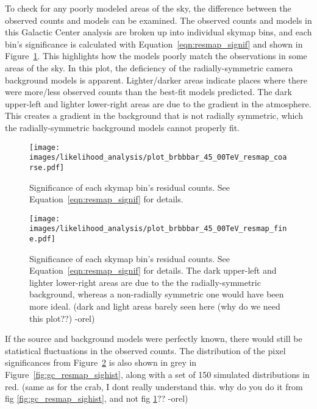  To check for any poorly modeled areas of the sky, the difference between the observed counts and models can be examined.
  The observed counts and models in this Galactic Center analysis are broken up into individual skymap bins, and each bin's significance is calculated with Equation~\ref{eqn:resmap_signif} and shown in Figure~\ref{fig:gc_resmap}.
  This highlights how the models poorly match the observations in some areas of the sky.
  In this plot, the deficiency of the radially-symmetric camera background models is apparent.
  Lighter/darker areas indicate places where there were more/less observed counts than the best-fit models predicted.
  The dark upper-left and lighter lower-right areas are due to the gradient in the atmosphere.
  This creates a gradient in the background that is not radially symmetric, which the radially-symmetric background models cannot properly fit.
  
  \begin{figure}[ht]
    \centering
    \texttt{[image: images/likelihood\_analysis/plot\_brbbbar\_45\_00TeV\_resmap\_coarse.pdf]}
    \caption[Galactic Center Residual Map Coarse Binning]
    {
      Significance of each skymap bin's residual counts.
      See Equation~\ref{eqn:resmap_signif} for details.
    }
    \label{fig:gc_resmap}
  \end{figure}
  
  \begin{figure}[ht]
    \centering
    \texttt{[image: images/likelihood\_analysis/plot\_brbbbar\_45\_00TeV\_resmap\_fine.pdf]}
    \caption[Galactic Center Residual Map Fine Binning]
    {
      Significance of each skymap bin's residual counts.
      See Equation~\ref{eqn:resmap_signif} for details.
      The dark upper-left and lighter lower-right areas are due to the the radially-symmetric background, whereas a non-radially symmetric one would have been more ideal.
      {\color{red}(dark and light areas barely seen here (why do we need this plot??) -orel)}
    }
    \label{fig:gc_resmap_fine}
  \end{figure}
  
  If the source and background models were perfectly known, there would still be statistical fluctuations in the observed counts.
  The distribution of the pixel significances from Figure~\ref{fig:gc_resmap_fine} is also shown in grey in Figure~\ref{fig:gc_resmap_sighist}, along with a set of 150 simulated distributions in red.
  {\color{red}(same as for the crab, I dont really understand this.  why do you do it from fig \ref{fig:gc_resmap_sighist}, and not fig \ref{fig:gc_resmap}?? -orel)}
  
